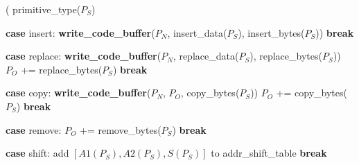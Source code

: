 \begin{algorithm}
\singlespace
\begin{algorithmic}[1]
\singlespace
{}
	
( primitive\_type($P_S$)

\STATE \hspace{5 mm} {\bf case} insert:
\STATE \hspace{10 mm} {\bf write\_code\_buffer}($P_N$, insert\_data($P_S$), insert\_bytes($P_S$))
\STATE \hspace{10 mm} {\bf break}

\STATE \hspace{5 mm} {\bf case} replace:
\STATE \hspace{10 mm} {\bf write\_code\_buffer}($P_N$, replace\_data($P_S$), replace\_bytes($P_S$))
\STATE \hspace{10 mm} $P_O$ += replace\_bytes($P_S$)
\STATE \hspace{10 mm} {\bf break}

\STATE \hspace{5 mm} {\bf case} copy:
\STATE \hspace{10 mm} {\bf write\_code\_buffer}($P_N$, $P_O$, copy\_bytes($P_S$))
\STATE \hspace{10 mm} $P_O$ += copy\_bytes($P_S$)
\STATE \hspace{10 mm} {\bf break}

\STATE \hspace{5 mm} {\bf case} remove:
\STATE \hspace{10 mm}  $P_O$ += remove\_bytes($P_S$)
\STATE \hspace{10 mm} {\bf break}

\STATE \hspace{5 mm} {\bf case} shift:
\STATE \hspace{10 mm} add $\left[ A1(P_S), A2(P_S), S(P_S)\right]$ to addr\_shift\_table
\STATE \hspace{10 mm} {\bf break}


\end{algorithmic}
\end{algorithm}
